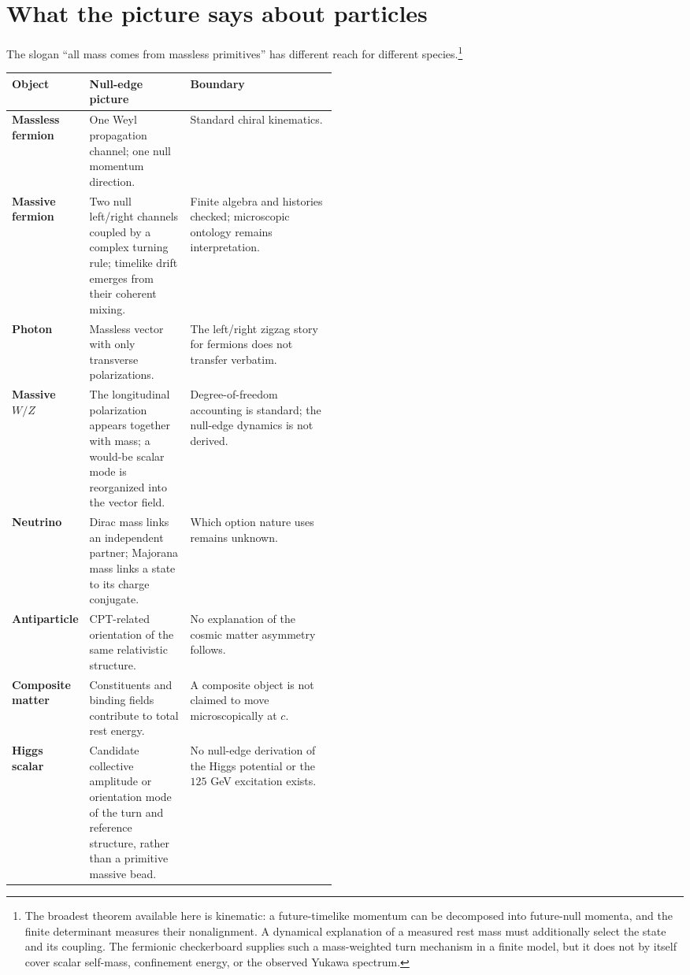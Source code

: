 \documentclass[11pt]{article}
\begin{document}
\section{What the picture says about particles}
\label{sec:particles}

The slogan ``all mass comes from massless primitives'' has different reach for
different species.\footnote{The broadest theorem available here is kinematic:
a future-timelike momentum can be decomposed into future-null momenta, and the
finite determinant measures their nonalignment.  A dynamical explanation of a
measured rest mass must additionally select the state and its coupling.  The
fermionic checkerboard supplies such a mass-weighted turn mechanism in a finite
model, but it does not by itself cover scalar self-mass, confinement energy, or
the observed Yukawa spectrum.}

\begin{center}
\begin{tabularx}{0.97\linewidth}{@{}>{\bfseries}p{0.17\linewidth}p{0.31\linewidth}X@{}}
\toprule
Object & Null-edge picture & Boundary\\
\midrule
Massless fermion & One Weyl propagation channel; one null momentum direction. &
Standard chiral kinematics.\\
Massive fermion & Two null left/right channels coupled by a complex turning rule;
timelike drift emerges from their coherent mixing. &
Finite algebra and histories checked; microscopic ontology remains interpretation.\\
Photon & Massless vector with only transverse polarizations. &
The left/right zigzag story for fermions does not transfer verbatim.\\
Massive $W/Z$ & The longitudinal polarization appears together with mass; a
would-be scalar mode is reorganized into the vector field. &
Degree-of-freedom accounting is standard; the null-edge dynamics is not derived.\\
Neutrino & Dirac mass links an independent partner; Majorana mass links a state
to its charge conjugate. & Which option nature uses remains unknown.\\
Antiparticle & CPT-related orientation of the same relativistic structure. &
No explanation of the cosmic matter asymmetry follows.\\
Composite matter & Constituents and binding fields contribute to total rest
energy. & A composite object is not claimed to move microscopically at $c$.\\
Higgs scalar & Candidate collective amplitude or orientation mode of the turn
and reference structure, rather than a primitive massive bead. & No null-edge
derivation of the Higgs potential or the $125$ GeV excitation exists.\\
\bottomrule
\end{tabularx}
\end{center}
\end{document}
